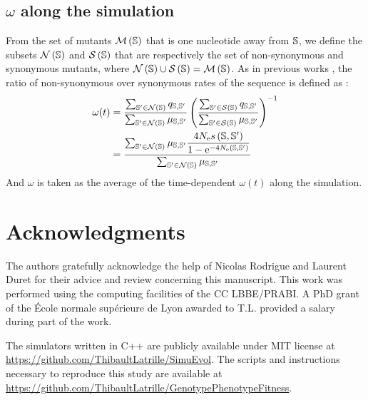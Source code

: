\subsection{\texorpdfstring{$\omega$}{ω} along the simulation}
From the set of mutants $\mathcal{M}\left(\mathbb{S}\right)$ that is one nucleotide away from $\mathbb{S}$, we define the subsets $\mathcal{N}\left(\mathbb{S}\right)$ and $\mathcal{S}\left(\mathbb{S}\right)$ that are respectively the set of non-synonymous and synonymous mutants, where $\mathcal{N}\left(\mathbb{S}\right) \cup \mathcal{S}\left(\mathbb{S}\right) = \mathcal{M}\left(\mathbb{S}\right)$.
As in previous works \citep{Spielman2015, DosReis2015, Jones2016}, the ratio of non-synonymous over \gls{synonymous} rates of the sequence is defined as :
\begin{align}
\omega(t) &= \dfrac{\sum_{\mathbb{S}' \in \mathcal{N}\left(\mathbb{S}\right)} q_{\mathbb{S}, \mathbb{S}'}}{\sum_{\mathbb{S}' \in \mathcal{N}\left(\mathbb{S}\right)} \mu_{\mathbb{S}, \mathbb{S}'}} \left( \dfrac{\sum_{\mathbb{S}' \in \mathcal{S}\left(\mathbb{S}\right)} q_{\mathbb{S}, \mathbb{S}'}}{\sum_{\mathbb{S}' \in \mathcal{S}\left(\mathbb{S}\right)} \mu_{\mathbb{S}, \mathbb{S}'}} \right)^{-1}\\
&= \dfrac{\sum_{\mathbb{S}' \in \mathcal{N}\left(\mathbb{S}\right)} \mu_{\mathbb{S}, \mathbb{S}'} \dfrac{4 N_{\mathrm{e}} s \left( \mathbb{S},\mathbb{S}'\right)}{{1 - \mathrm{e}^{-4 N_{\mathrm{e}} \left( \mathbb{S},\mathbb{S}'\right)} }}}{\sum_{\mathbb{S}' \in \mathcal{N}\left(\mathbb{S}\right)} \mu_{\mathbb{S}, \mathbb{S}'}} 
\end{align}
And $\omega$ is taken as the average of the time-dependent $\omega(t)$ along the simulation.

\section{Acknowledgments}

The authors gratefully acknowledge the help of Nicolas Rodrigue and Laurent Duret for their advice and review concerning this manuscript.
This work was performed using the computing facilities of the CC LBBE/PRABI.
A PhD grant of the École normale supérieure de Lyon awarded to T.L. provided a salary during part of the work.

The simulators written in C++ are publicly available under MIT license at \url{https://github.com/ThibaultLatrille/SimuEvol}.
The scripts and instructions necessary to reproduce this study are available at \url{https://github.com/ThibaultLatrille/GenotypePhenotypeFitness}.

